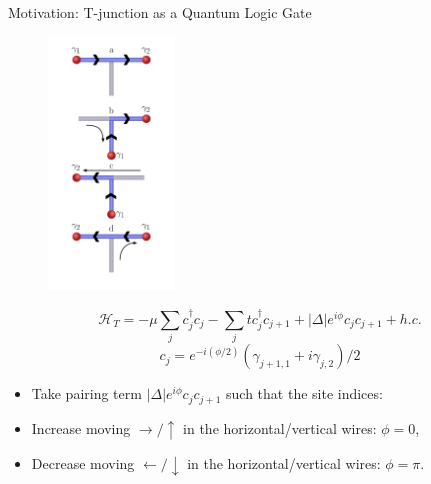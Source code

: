 \documentclass[xcolor=dvipsnames,10pt,aspectratio=169]{beamer}
\newcommand{\ham}{\mathcal{H}}
\newcommand{\cc}{c^{\dagger}}
\newcommand{\de}{\Delta}
\newcommand{\MO}{Motivation}
\begin{document}
  \begin{frame}{\MO: T-junction as a Quantum Logic Gate}

    \begin{multicols}{3}
    \begin{figure}
      \includegraphics[width=0.30\textwidth]{./figures/t-junction-braid.pdf}
    \end{figure}

      \begin{minipage}{0.67\textwidth}
      \small
      \begin{equation}
        \ham_T = -\mu \sum_j \cc_j c_j - \sum_j t \cc_j c_{j+1} + |\de| e^{i\phi} c_j c_{j+1} + h.c.
      \end{equation}
      \begin{equation}
        c_j = e^{-i(\phi/2)}(\gamma_{j+1,1} + i \gamma_{j,2})/2
      \end{equation}
      \begin{itemize}
        \footnotesize
        \item Take pairing term $|\de|e^{i\phi} c_j c_{j+1}$ such that the site indices:
        \item Increase moving $\rightarrow / \uparrow$ in the horizontal/vertical wires: $\phi=0$,
        \item Decrease moving $\leftarrow / \downarrow$ in the horizontal/vertical wires: $\phi=\pi$.
      \end{itemize}


\end{minipage}
\end{multicols}
\end{frame}
\end{document}
